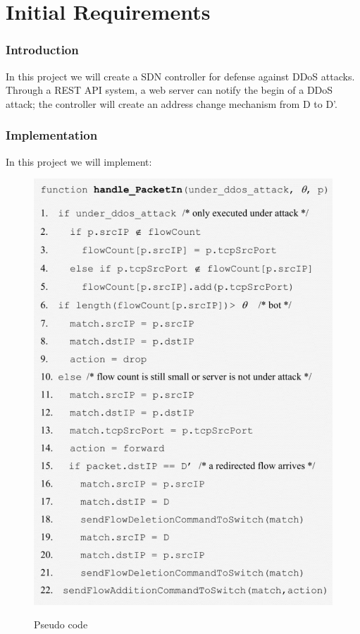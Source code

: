 \chapter{Initial Requirements}

\subsection{Introduction}
In this project we will create a SDN controller for defense against DDoS attacks. Through a REST API system, a web server can notify the begin of a DDoS attack; the controller will create an address change mechanism from D to D’.

\subsection{Implementation}
In this project we will implement:
\begin{figure}[H]
\begin{center}
\includegraphics[]{../images/PseudoCode.png}
\label{fig:pseudocode}
\caption{Pseudo code}
\end{center}
\end{figure}

